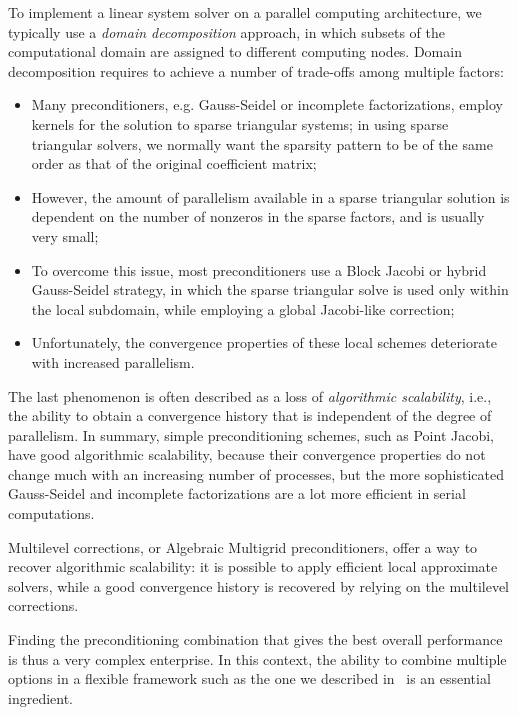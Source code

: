To implement a linear system solver on a parallel computing
architecture, we typically use a \emph{domain decomposition} approach,
in which subsets of the computational domain are assigned to different
computing nodes. Domain decomposition requires to achieve a number of
trade-offs among multiple factors:
\begin{itemize}
\item Many preconditioners, e.g. Gauss-Seidel or incomplete
  factorizations, employ kernels for the solution to sparse triangular
  systems; in using sparse triangular solvers, we normally  want the
  sparsity pattern to be of the same order as that of the original
  coefficient matrix;
\item However, the amount of parallelism available in a sparse
  triangular solution is dependent on the number of nonzeros in the
  sparse factors, and is usually very small;
\item To overcome this issue, most preconditioners use a Block Jacobi
  or hybrid Gauss-Seidel strategy, in which the sparse triangular
  solve is used only within the local subdomain, while employing a
  global Jacobi-like correction;
\item Unfortunately, the convergence properties of these local schemes
  deteriorate with increased parallelism.
\end{itemize}
The last phenomenon is often described as a loss of \emph{algorithmic
  scalability}, i.e., the ability to obtain a convergence history that
is independent of the degree of parallelism. In summary, simple
preconditioning schemes, such as Point Jacobi, have good algorithmic scalability,
because their convergence properties do not change much with an
increasing number of processes, but the more sophisticated
Gauss-Seidel and incomplete factorizations are a lot more efficient in
serial computations. 

Multilevel corrections, or Algebraic Multigrid  preconditioners, offer
a way to recover algorithmic scalability: 
it is possible to apply efficient local approximate solvers, while a
good convergence history is recovered by relying on the multilevel
corrections. 

Finding the preconditioning combination that gives the best overall
performance is thus a very complex enterprise. In this context, the
ability to combine multiple options in a flexible framework such as
the one we described in~\cite{mld-toms} is an essential ingredient. 

